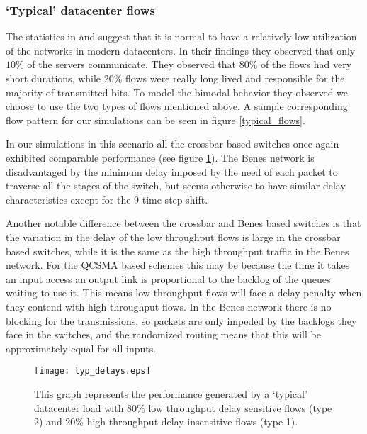 \documentclass{IEEEtran}%
\begin{document}
\subsubsection{`Typical' datacenter flows}
The statistics in \cite{Benson} and \cite{Kandula} suggest that it is normal to have a relatively low utilization of the networks in modern datacenters.  In their findings they observed that only $10\%$ of the servers communicate.  They observed that $80\%$ of the flows had very short durations, while $20\%$ flows were really long lived and responsible for the majority of transmitted bits.  To model the bimodal behavior they observed we choose to use the two types of flows mentioned above.  A sample corresponding flow pattern for our simulations can be seen in figure \ref{typical_flows}.


In our simulations in this scenario all the crossbar based switches once again exhibited comparable performance (see figure \ref{typ_delays}).  The Benes network is disadvantaged by the minimum delay imposed by the need of each packet to traverse all the stages of the switch, but seems otherwise to have similar delay characteristics except for the 9 time step shift.

Another notable difference between the crossbar and Benes based switches is that the variation in the delay of the low throughput flows is large in the crossbar based switches, while it is the same as the high throughput traffic in the Benes network.  For the QCSMA based schemes this may be because the time it takes an input access an output link is proportional to the backlog of the queues waiting to use it.  This means low throughput flows will face a delay penalty when they contend with high throughput flows.  In the Benes network there is no blocking for the transmissions, so packets are only impeded by the backlogs they face in the switches, and the randomized routing means that this will be approximately equal for all inputs.


\begin{figure}%
	 \texttt{[image: typ\_delays.eps]}
	\caption{This graph represents the performance generated by a `typical' datacenter load with $80\%$ low throughput delay sensitive flows (type 2) and $20\%$ high throughput delay insensitive flows (type 1).}
	\label{typ_delays}
\end{figure}
\end{document}
